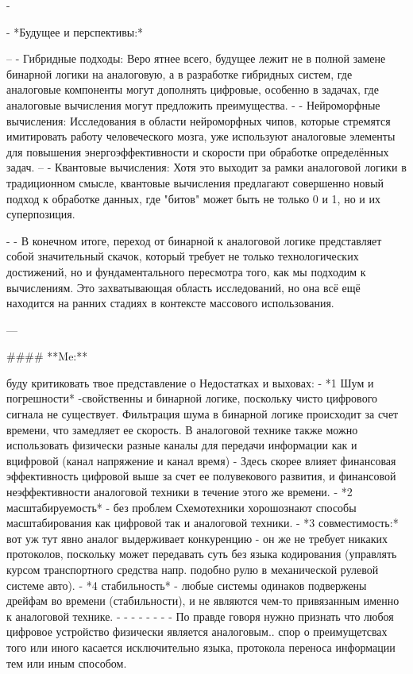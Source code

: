 -  

-  *Будущее и перспективы:*

--   - Гибридные подходы: Веро  ятнее всего, будущее лежит не в полной замене бинарной логики на аналоговую, а в разработке гибридных систем, где аналоговые компоненты могут дополнять цифровые, особенно в задачах, где аналоговые вычисления могут предложить преимущества.
-   - Нейроморфные вычисления: Исследования в области нейроморфных чипов, которые стремятся имитировать работу человеческого мозга, уже используют аналоговые элементы для повышения энергоэффективности и скорости при обработке определённых задач.
--   - Квантовые вычисления: Хотя это выходит за рамки аналоговой логики в традиционном смысле, квантовые вычисления предлагают совершенно новый подход к обработке данных, где "битов" может быть не только 0 и 1, но и их суперпозиция.

-  
-  В конечном итоге, переход от бинарной к аналоговой логике представляет собой значительный скачок, который требует не только технологических достижений, но и фундаментального пересмотра того, как мы подходим к вычислениям. Это захватывающая область исследований, но она всё ещё находится на ранних стадиях в контексте массового использования.

--- 



#### **Me:** 

буду критиковать твое представление о Недостатках и выховах:
-  *1 Шум и погрешности* -свойственны и бинарной логике, поскольку чисто цифрового сигнала не существует. Фильтрация шума в бинарной логике происходит за счет времени, что замедляет ее скорость. В аналоговой технике также можно использовать физически разные каналы для передачи информации как и вцифровой (канал напряжение и канал время)
-   Здесь скорее влияет финансовая эффективность цифровой выше за счет ее полувекового развития, и финансовой неэффективности аналоговой техники в течение этого же времени.
-   *2 масштабируемость* - без проблем Схемотехники хорошознают способы масштабирования как цифровой так и аналоговой техники.
-   *3 совместимость:* вот уж тут явно аналог выдерживает конкуренцию - он же не требует никаких протоколов, поскольку может передавать суть без языка кодирования (управлять курсом транспортного средства напр. подобно рулю в механической рулевой системе авто).
-   *4 стабильность* - любые системы одинаков подвержены дрейфам во времени (стабильности), и не являются чем-то привязанным именно к аналоговой технике.
- - - - - - -
-  По правде говоря нужно признать что любоя цифровое устройство физически является аналоговым.. спор о преимущетсвах того или иного касается исключительно языка, протокола переноса информации тем или иным способом.


